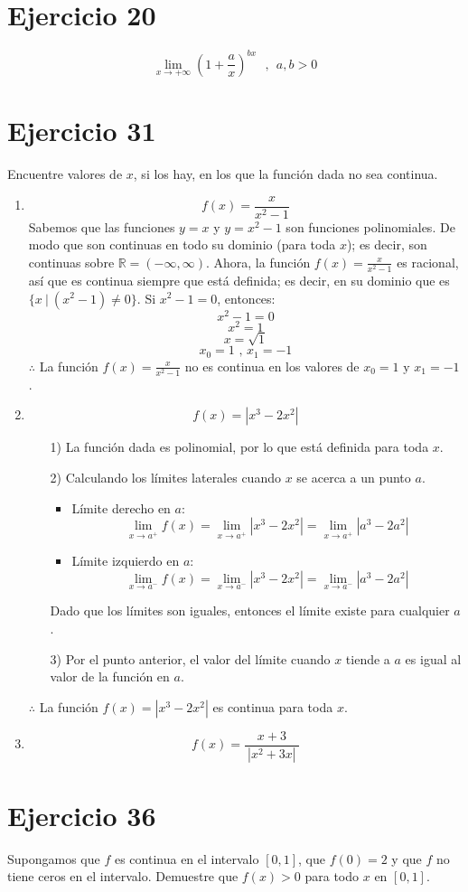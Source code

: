 \documentclass[12pt]{article}
\begin{document}
\section{Ejercicio 20}
\[
\lim_{x \to + \infty} (1+\frac{a}{x})^{bx} ~ ~ ~,~ ~ a,b>0
\]

\section{Ejercicio 31}
Encuentre valores de $x$, si los hay, en los que la función dada no sea continua.
\begin{enumerate}[label=(\alph*)]
\item \[ f(x)=\frac{x}{x^2-1} \]
Sabemos que las funciones $y=x$ y $y=x^2-1$ son funciones polinomiales. De modo que son continuas en todo su dominio (para toda $x$); es decir, son continuas sobre $\mathbb R=(-\infty,\infty)$. Ahora, la función $f(x)=\frac{x}{x^2-1}$ es racional, así que es continua siempre que está definida; es decir, en su dominio que es $\{ x ~|~ (x^2-1) \neq 0 \}$. Si $x^2-1=0$, entonces:
\[
x^2-1=0
\]
\[
x^2=1
\]
\[
x=\sqrt{1}
\]
\[
x_0=1 \text{ , } x_1=-1
\]
$\therefore$ La función $f(x)=\frac{x}{x^2-1}$ no es continua en los valores de $x_0=1 \text{ y } x_1=-1$.

\item \[ f(x)= | x^3-2x^2 | \]
\begin{enumerate}
	\item[1)] La función dada es polinomial, por lo que está definida para toda $x$.
	\item[2)] Calculando los límites laterales cuando $x$ se acerca a un punto $a$.
	\begin{itemize}
		\item Límite derecho en $a$:
		\[ 
		\lim_{x \to a^+}f(x) = \lim_{x \to a^+}| x^3-2x^2 | =\lim_{x \to a^+}| a^3-2a^2 |
		\]
		\item Límite izquierdo en $a$:
		\[ 
		\lim_{x \to a^-}f(x) = \lim_{x \to a^-}| x^3-2x^2 | =\lim_{x \to a^-}| a^3-2a^2 |
		\]
	\end{itemize}
	Dado que los límites son iguales, entonces el límite existe para cualquier $a$.
	\item[3)] Por el punto anterior, el valor del límite cuando $x$ tiende a $a$ es igual al valor de la función en $a$.
\end{enumerate}
$\therefore$ La función $f(x)= |x^3-2x^2 |$ es continua para toda $x$.

\item \[ f(x)=\frac{x+3}{~|x^2+3x|~} \]
\end{enumerate}

\section{Ejercicio 36}
Supongamos que $f$ es continua en el intervalo $[0, 1]$, que $f(0) = 2$ y que $f$ no tiene ceros en el intervalo. Demuestre que $f(x) > 0$ para todo $x$ en $[0, 1]$.
\end{document}
